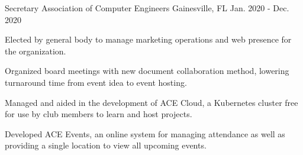\begin{cventries}
  \cventry
    {Secretary}
    {Association of Computer Engineers}
    {Gainesville, FL}
    {Jan. 2020 - Dec. 2020}
    {
      \begin{cvitems}
        \item {Elected by general body to manage marketing operations and web presence for the organization.}
        \item {Organized board meetings with new document collaboration method, lowering turnaround time from event idea to event hosting.}
        \item {Managed and aided in the development of ACE Cloud, a Kubernetes cluster free for use by club members to learn and host projects.}
        \item {Developed ACE Events, an online system for managing attendance as well as providing a single location to view all upcoming events.}
      \end{cvitems}
    }
\end{cventries}
